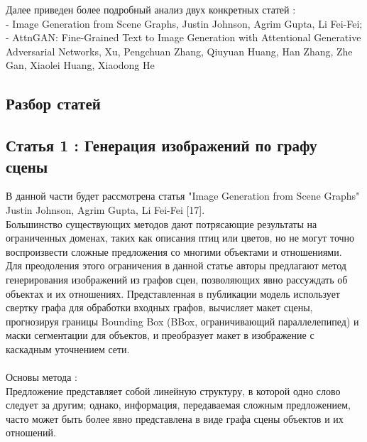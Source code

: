 \documentclass{article}
\begin{document}
    Далее приведен более подробный анализ двух конкретных статей :\\  - Image Generation from Scene Graphs, Justin Johnson, Agrim Gupta, Li Fei-Fei;\\  - AttnGAN: Fine-Grained Text to Image Generation
with Attentional Generative Adversarial Networks, Xu, Pengchuan Zhang, Qiuyuan Huang, Han Zhang, Zhe Gan, Xiaolei Huang, Xiaodong He
    
    
    \newpage
    \begin{center} 
    \section{Разбор статей}
    \subsection{Статья 1 : Генерация изображений по графу сцены}
    \end{center} 
      \large В данной части будет рассмотрена статья "Image Generation from Scene Graphs" Justin Johnson, Agrim Gupta, Li Fei-Fei [17]. \\
      Большинство существующих методов дают потрясающие результаты на ограниченных доменах, таких
как описания птиц или цветов, но не могут точно воспроизвести
сложные предложения со многими объектами и отношениями.\\
Для преодоления этого ограничения в данной статье авторы предлагают метод
генерирования изображений из графов сцен, позволяющих явно рассуждать об
объектах и их отношениях. Представленная в публикации модель использует свертку графа для
обработки входных графов, вычисляет макет сцены, прогнозируя границы
Bounding Box (BBox, ограничивающий параллелепипед) и маски сегментации для объектов, и преобразует макет в
изображение с каскадным уточнением сети.\\ \\
Основы метода :\\
Предложение представляет собой линейную структуру, в которой одно слово следует за другим; однако,
информация, передаваемая сложным предложением, часто может быть более явно представлена в виде графа сцены
объектов и их отношений.\\ \\
\end{document}
